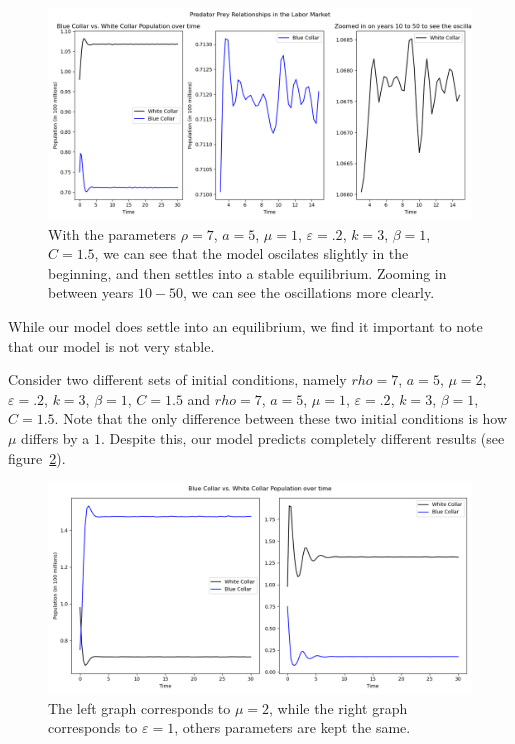 \documentclass[11pt]{amsart}
\begin{document}
\begin{figure}[h]
    \centering
    \includegraphics[width=.8\textwidth]{figures/blue_vs_white2.png}
    \caption{With the parameters $\rho = 7$, $a = 5$, $\mu = 1$, $\varepsilon = .2$, $k = 3$, $\beta = 1$, $C = 1.5$, we can see that the model oscilates
    slightly in the beginning, and then settles into a stable equilibrium. Zooming in between years $10-50$, we can see the oscillations more clearly.}
    \label{fig:results_wb_1}
\end{figure}


While our model does settle into an equilibrium, we find it important to note that our model is not very stable.

Consider two different sets of initial conditions, namely $rho = 7$, $a = 5$, $\mu = 2$, $\varepsilon = .2$, $k = 3$, $\beta = 1$, $C = 1.5$ and 
$rho = 7$, $a = 5$, $\mu = 1$, $\varepsilon = .2$, $k = 3$, $\beta = 1$, $C = 1.5$. Note that the only difference between these two initial conditions is
how $\mu$ differs by a $1$. Despite this, our model predicts completely different results (see figure~\ref{fig:results_wb_3}).

\begin{figure}[h]
    \centering
    \includegraphics[width=.8\textwidth]{figures/bad_paramenters.png}
    \caption{The left graph corresponds to $\mu = 2$, while the right graph corresponds to $\varepsilon = 1$, others parameters are kept the same.}
    \label{fig:results_wb_3}
\end{figure}
\end{document}
